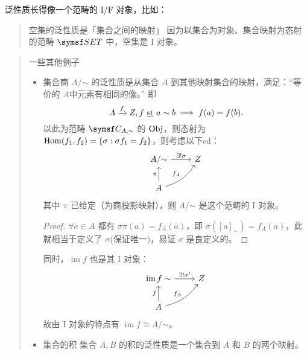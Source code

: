 泛性质长得像一个范畴的 I/F 对象，比如：

\begin{quote}{空集的泛性质是「集合之间的映射」}
    因为以集合为对象、集合映射为态射的范畴 \(\SET\) 中，空集是 I 对象。
\end{quote}

\begin{quote}{一些其他例子}
    \begin{itemize}
        \item 集合商 \(A / \mathord\sim\) 的泛性质是从集合 \(A\) 到其他映射集合的映射，满足：“等价的 \(A\)中元素有相同的像。”
              即
              \[
                  A\xrightarrow{f}Z, f\text{ \underline{st} } a\sim b \implies f(a) = f(b)
                  .\]
              以此为范畴 \(\symsf C_{A,\sim}\) 的 \(\operatorname{Obj}\)，则态射为 \(\Hom(f_1,f_2) = \left\{ \sigma :\sigma f_1=f_2 \right\} \)，则考虑以下cd：
              \[
                  \begin{tikzcd}
                      A/\mathord \sim\arrow[r, "\exists !\sigma"]          & Z  \\
                      A \arrow[u, "\pi"]\arrow[ur, "f_A", bend right = 20] & {}
                  \end{tikzcd}
              \]
              其中 \(\pi \) 已给定（为商投影映射），则 \(A/\mathord\sim\) 是这个范畴的 I 对象。
              \begin{proof}{}
                  \(\forall a\in A\) 都有 \(\sigma \pi (a) = f_A(a)\)，即 \(\sigma \left( [a]_{\sim} \right) = f_A(a) \)，此就相当于定义了 \(\sigma\)(保证唯一)，易证 \(\sigma\) 是良定义的。
              \end{proof}
              同时，\(\operatorname{im}f\) 也是其 I 对象：
              \[
                  \begin{tikzcd}
                      \operatorname{im}f \sim\arrow[r, "\exists !\sigma'"] & Z  \\
                      A \arrow[u, "f"]\arrow[ur, "f_A", bend right = 20]   & {}
                  \end{tikzcd}
              \]
              故由 I 对象的特点有 \(\operatorname{im}f \cong A / \mathord\sim\)。
        \item 集合的积
              集合 \(A,B\) 的积的泛性质是一个集合到 \(A\) 和 \(B\) 的两个映射。


\end{itemize}
\end{quote}

